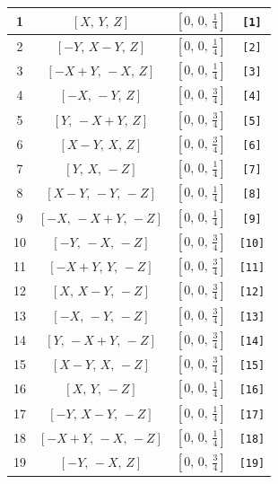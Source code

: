 \documentclass[fleqn,8pt]{jsarticle}
\begin{document}
\begin{longtable}{cccc}
1 & $\left[ X,\, Y,\, Z \right]$ & $\left[ 0,\, 0,\, \frac{1}{4} \right]$ & {\tt [1]} \\ \hline
2 & $\left[ - Y,\, X - Y,\, Z \right]$ & $\left[ 0,\, 0,\, \frac{1}{4} \right]$ & {\tt [2]} \\ \hline
3 & $\left[ - X + Y,\, - X,\, Z \right]$ & $\left[ 0,\, 0,\, \frac{1}{4} \right]$ & {\tt [3]} \\ \hline
4 & $\left[ - X,\, - Y,\, Z \right]$ & $\left[ 0,\, 0,\, \frac{3}{4} \right]$ & {\tt [4]} \\ \hline
5 & $\left[ Y,\, - X + Y,\, Z \right]$ & $\left[ 0,\, 0,\, \frac{3}{4} \right]$ & {\tt [5]} \\ \hline
6 & $\left[ X - Y,\, X,\, Z \right]$ & $\left[ 0,\, 0,\, \frac{3}{4} \right]$ & {\tt [6]} \\ \hline
7 & $\left[ Y,\, X,\, - Z \right]$ & $\left[ 0,\, 0,\, \frac{1}{4} \right]$ & {\tt [7]} \\ \hline
8 & $\left[ X - Y,\, - Y,\, - Z \right]$ & $\left[ 0,\, 0,\, \frac{1}{4} \right]$ & {\tt [8]} \\ \hline
9 & $\left[ - X,\, - X + Y,\, - Z \right]$ & $\left[ 0,\, 0,\, \frac{1}{4} \right]$ & {\tt [9]} \\ \hline
10 & $\left[ - Y,\, - X,\, - Z \right]$ & $\left[ 0,\, 0,\, \frac{3}{4} \right]$ & {\tt [10]} \\ \hline
11 & $\left[ - X + Y,\, Y,\, - Z \right]$ & $\left[ 0,\, 0,\, \frac{3}{4} \right]$ & {\tt [11]} \\ \hline
12 & $\left[ X,\, X - Y,\, - Z \right]$ & $\left[ 0,\, 0,\, \frac{3}{4} \right]$ & {\tt [12]} \\ \hline
13 & $\left[ - X,\, - Y,\, - Z \right]$ & $\left[ 0,\, 0,\, \frac{3}{4} \right]$ & {\tt [13]} \\ \hline
14 & $\left[ Y,\, - X + Y,\, - Z \right]$ & $\left[ 0,\, 0,\, \frac{3}{4} \right]$ & {\tt [14]} \\ \hline
15 & $\left[ X - Y,\, X,\, - Z \right]$ & $\left[ 0,\, 0,\, \frac{3}{4} \right]$ & {\tt [15]} \\ \hline
16 & $\left[ X,\, Y,\, - Z \right]$ & $\left[ 0,\, 0,\, \frac{1}{4} \right]$ & {\tt [16]} \\ \hline
17 & $\left[ - Y,\, X - Y,\, - Z \right]$ & $\left[ 0,\, 0,\, \frac{1}{4} \right]$ & {\tt [17]} \\ \hline
18 & $\left[ - X + Y,\, - X,\, - Z \right]$ & $\left[ 0,\, 0,\, \frac{1}{4} \right]$ & {\tt [18]} \\ \hline
19 & $\left[ - Y,\, - X,\, Z \right]$ & $\left[ 0,\, 0,\, \frac{3}{4} \right]$ & {\tt [19]} \\ \hline

\end{longtable}
\end{document}
